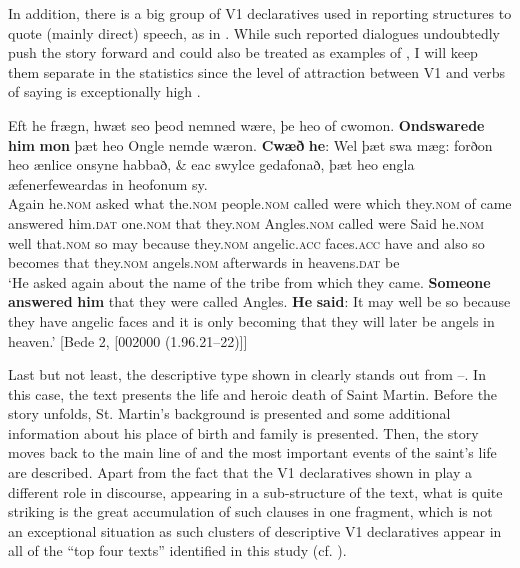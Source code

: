 \documentclass[output=paper,colorlinks,citecolor=brown]{langscibook}
\begin{document}
In addition, there is a big group of V1 declaratives used in reporting structures to quote (mainly direct) speech, as in . While such reported dialogues undoubtedly push the story forward and could also be treated as examples of , I will keep them separate in the statistics since the level of attraction between V1 and verbs of saying is exceptionally high \citep{Cichosz2017b}.

\ea%
\label{ex:cichosz:9}
\gll Eft   he     frægn,   hwæt   seo     þeod     nemned wære,   þe   heo     of   cwomon. \textbf{Ondswarede}   \textbf{him} \textbf{mon} þæt   heo     Ongle     nemde   wæron. \textbf{Cwæð}   \textbf{he}:  Wel   þæt     swa   mæg:   forðon   heo     ænlice     onsyne habbað,   \& eac   swylce   gedafonað,   þæt   heo     engla æfenerfeweardas   in heofonum     sy.\\
Again   he.\textsc{nom}   asked   what   the.\textsc{nom}  people.\textsc{nom}   called were   which   they.\textsc{nom}   of   came     answered   him.\textsc{dat} one.\textsc{nom}   that  they.\textsc{nom}   Angles.\textsc{nom}   called   were   Said   he.\textsc{nom} well   that.\textsc{nom}   so   may   because they.\textsc{nom}   angelic.\textsc{acc}   faces.\textsc{acc} have     and   also   so   becomes   that   they.\textsc{nom}   angels.\textsc{nom} afterwards     in heavens.\textsc{dat}  be\\
\glt ‘He asked again about the name of the tribe from which they came. \textbf{Someone} \textbf{answered} \textbf{him} {that they were called Angles.} \textbf{He} \textbf{said}: It may well be so because they have angelic faces and it is only becoming that they will later be angels in heaven.' \hfill [Bede 2, [002000 (1.96.21--22)]]
\z

Last but not least, the descriptive type shown in  clearly stands out from --. In this case, the text presents the life and heroic death of Saint Martin. Before the story unfolds, St. Martin's background is presented and some additional information about his place of birth and family is presented. Then, the story moves back to the main line of  and the most important events of the saint's life are described. Apart from the fact that the V1 declaratives shown in  play a different role in discourse, appearing in a sub-structure of the text, what is quite striking is the great accumulation of such clauses in one fragment, which is not an exceptional situation as such clusters of descriptive V1 declaratives appear in all of the “top four texts” identified in this study (cf. ).
\end{document}
